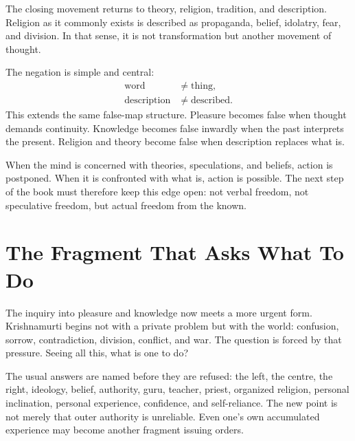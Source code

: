 \documentclass[11pt,oneside]{book}
\begin{document}
The closing movement returns to theory, religion, tradition, and description. Religion as it commonly exists is described as propaganda, belief, idolatry, fear, and division. In that sense, it is not transformation but another movement of thought.

The negation is simple and central:
\begin{align}
\text{word} &\ne \text{thing},\\
\text{description} &\ne \text{described}.
\end{align}
This extends the same false-map structure. Pleasure becomes false when thought demands continuity. Knowledge becomes false inwardly when the past interprets the present. Religion and theory become false when description replaces what is.

When the mind is concerned with theories, speculations, and beliefs, action is postponed. When it is confronted with what is, action is possible. The next step of the book must therefore keep this edge open: not verbal freedom, not speculative freedom, but actual freedom from the known.


\chapter{The Fragment That Asks What To Do}

The inquiry into pleasure and knowledge now meets a more urgent form. Krishnamurti begins not with a private problem but with the world: confusion, sorrow, contradiction, division, conflict, and war. The question is forced by that pressure. Seeing all this, what is one to do?

The usual answers are named before they are refused: the left, the centre, the right, ideology, belief, authority, guru, teacher, priest, organized religion, personal inclination, personal experience, confidence, and self-reliance. The new point is not merely that outer authority is unreliable. Even one's own accumulated experience may become another fragment issuing orders.
\end{document}
